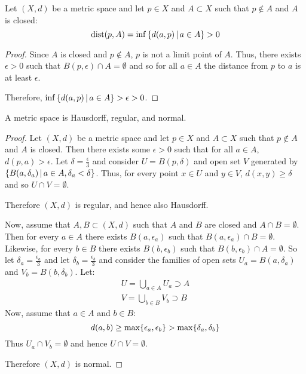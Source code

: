 \documentclass[letterpaper,12pt,fleqn]{article}
\newcommand{\e}{\epsilon}
\renewcommand{\d}{\delta}
\DeclareMathOperator{\dist}{dist}
\begin{document}
\begin{lemma}
  Let \((X,d)\) be a metric space and let \(p\in X\) and \(A\subset X\) such that \(p\notin A\) and \(A\) is
  closed:
  \[\dist(p,A)=\inf\setb{d(a,p)}{a\in A}>0\]
\end{lemma}

\begin{proof}
  Since \(A\) is closed and \(p\notin A\), \(p\) is not a limit point of \(A\).  Thus, there exists \(\e>0\) such
  that \(B(p,\e)\cap A=\emptyset\) and so for all \(a\in A\) the distance from \(p\) to \(a\) is at least \(\e\).

  Therefore, \(\inf\setb{d(a,p)}{a\in A}>\e>0\).
\end{proof}

\begin{theorem}
  A metric space is Hausdorff, regular, and normal.
\end{theorem}

\begin{proof}
  Let \((X,d)\) be a metric space and let \(p\in X\) and \(A\subset X\) such that \(p\notin A\) and \(A\) is
  closed.  Then there exists some \(\e>0\) such that for all \(a\in A\), \(d(p,a)>\e\).  Let \(\d=\frac{\e}{3}\)
  and consider \(U=B(p,\d)\) and open set \(V\) generated by \(\setb{B(a,\d_a)}{a\in A,\d_a<\d}\).  Thus, for every
  point \(x\in U\) and \(y\in V\), \(d(x,y)\ge\d\) and so \(U\cap V=\emptyset\).

  Therefore \((X,d)\) is regular, and hence also Hausdorff.

  Now, assume that \(A,B\subset(X,d)\) such that \(A\) and \(B\) are closed and \(A\cap B=\emptyset\).  Then for
  every \(a\in A\) there exists \(B(a,\e_a)\) such that \(B(a,\e_a)\cap B=\emptyset\).  Likewise, for every \(b\in B\)
  there exists \(B(b,\e_b)\) such that \(B(b,\e_b)\cap A=\emptyset\).  So let \(\d_a=\frac{\e_a}{3}\) and let
  \(\d_b=\frac{\e_b}{3}\) and consider the families of open sets \(U_a=B(a,\d_a)\) and \(V_b=B(b,\d_b)\).  Let:
  \begin{align*}
    U=\bigcup_{a\in A}U_a\supset A \\
    V=\bigcup_{b\in B}V_b\supset B
  \end{align*}
  Now, assume that \(a\in A\) and \(b\in B\):
  \[d(a,b)\ge\max\set{\e_a,\e_b}>\max\set{\d_a,\d_b}\]
  Thus \(U_a\cap V_b=\emptyset\) and hence \(U\cap V=\emptyset\).

  Therefore \((X,d)\) is normal.
\end{proof}
\end{document}
